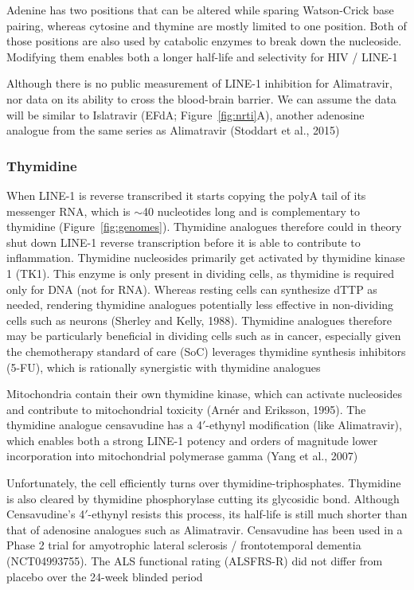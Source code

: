 \documentclass[11pt,twocolumn,twoside]{extarticle}
\begin{document}
Adenine has two positions that can be altered while sparing Watson-Crick base pairing, whereas cytosine and thymine are mostly limited to one position. Both of those positions are also used by catabolic enzymes to break down the nucleoside. Modifying them enables both a longer half-life and selectivity for HIV / LINE-1

Although there is no public measurement of LINE-1 inhibition for Alimatravir, nor data on its ability to cross the blood-brain barrier. We can assume the data will be similar to Islatravir (EFdA; Figure~\ref{fig:nrti}A), another adenosine analogue from the same series as Alimatravir (Stoddart et al., 2015)

\subsubsection{Thymidine}
When LINE-1 is reverse transcribed it starts copying the polyA tail of its messenger RNA, which is $\sim$40 nucleotides long and is complementary to thymidine (Figure~\ref{fig:genomes}). Thymidine analogues therefore could in theory shut down LINE-1 reverse transcription before it is able to contribute to inflammation. Thymidine nucleosides primarily get activated by thymidine kinase 1 (TK1). This enzyme is only present in dividing cells, as thymidine is required only for DNA (not for RNA). Whereas resting cells can synthesize dTTP as needed, rendering thymidine analogues potentially less effective in non-dividing cells such as neurons (Sherley and Kelly, 1988). Thymidine analogues therefore may be particularly beneficial in dividing cells such as in cancer, especially given the chemotherapy standard of care (SoC) leverages thymidine synthesis inhibitors (5-FU), which is rationally synergistic with thymidine analogues

Mitochondria contain their own thymidine kinase, which can activate nucleosides and contribute to mitochondrial toxicity (Arn\'er and Eriksson, 1995). The thymidine analogue censavudine has a 4$'$-ethynyl modification (like Alimatravir), which enables both a strong LINE-1 potency and orders of magnitude lower incorporation into mitochondrial polymerase gamma (Yang et al., 2007)

Unfortunately, the cell efficiently turns over thymidine-triphosphates. Thymidine is also cleared by thymidine phosphorylase cutting its glycosidic bond. Although Censavudine's 4$'$-ethynyl resists this process, its half-life is still much shorter than that of adenosine analogues such as Alimatravir. Censavudine has been used in a Phase 2 trial for amyotrophic lateral sclerosis / frontotemporal dementia (NCT04993755). The ALS functional rating (ALSFRS-R) did not differ from placebo over the 24-week blinded period
\end{document}
